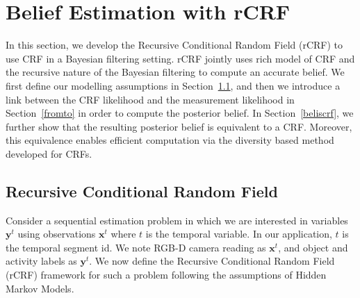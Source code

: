 \section{Belief Estimation with  rCRF}
\label{theory}
In this section, we develop the Recursive Conditional Random Field (rCRF) to use CRF in a Bayesian filtering setting. rCRF jointly uses rich model of CRF and the recursive nature of the Bayesian filtering to compute an accurate belief. We first define our modelling assumptions in Section~\ref{rcrfdef}, and then we introduce a link between the CRF likelihood and the measurement likelihood in Section~\ref{fromto} in order to compute the posterior belief. In Section~\ref{beliscrf}, we further show that the resulting posterior belief is equivalent to a CRF. Moreover, this equivalence enables efficient computation via the diversity based method \cite{divmbest} developed for CRFs.
\subsection{Recursive Conditional Random Field}
\label{rcrfdef}
Consider a sequential estimation problem in which we are interested in variables $\mathbf{y}^t$ using observations $\mathbf{x}^t$ where $t$ is the temporal variable. In our application, $t$ is the temporal segment id. We note RGB-D camera reading as $\mathbf{x}^t$, and object and activity labels as $\mathbf{y}^t$. We now define the Recursive Conditional Random Field (rCRF) framework for such a problem following the assumptions of Hidden Markov Models.

